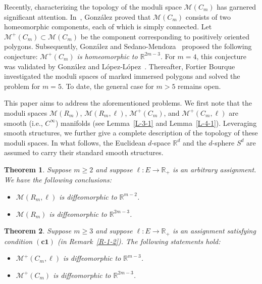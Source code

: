 \documentclass[11pt,letterpaper]{amsart}
\theoremstyle{plain}
\newtheorem{theorem}{Theorem}[section]
\theoremstyle{definition}
\theoremstyle{remark}
\numberwithin{equation}{section}
\begin{document}
Recently, characterizing the topology of the moduli space $\mathcal M(C_m)$ has garnered significant attention. In~\cite{Gonzalez-2018}, Gonz\'{a}lez proved that $\mathcal M(C_m)$ consists of two homeomorphic components, each of which is simply connected. Let $\mathcal M^{+}(C_m)\subset \mathcal M (C_m)$ be the component corresponding to positively oriented polygons. Subsequently, Gonz\'{a}lez and Sedano-Mendoza~\cite[Conjecture 1.1]{Gonzalez-2023} proposed the following conjecture: \emph{$\mathcal M^{+}(C_m)$ is homeomorphic to $\mathbb R^{2m-3}$}. For $m=4$, this
conjecture was validated by Gonz\'{a}lez and  L\'{o}pez-L\'{o}pez~\cite{Gonzalez-2016}. Thereafter, Fortier Bourque~\cite{Fortier Bourque-2024} investigated the moduli spaces of marked immersed polygons and solved the problem for $m=5$. To date, the general case for $m>5$ remains open.

This paper aims to address the aforementioned problems. We first note that the moduli spaces $\mathcal M(R_m)$, $\mathcal M(R_m,\ell)$, $\mathcal M^{+}(C_m)$, and $\mathcal M^{+}(C_m,\ell)$ are smooth (i.e., $C^\infty$) manifolds (see Lemma~\ref{L-3-1} and Lemma~\ref{L-4-1}). Leveraging smooth structures, we further give a complete description of the topology of these moduli spaces. In what follows, the Euclidean $d$-space $\mathbb R^d$ and the $d$-sphere $S^d$ are assumed to carry their standard smooth structures.


\begin{theorem}\label{T-1-3}
Suppose $m\geq 2$ and suppose $\ell:E\to\mathbb R_{+}$ is an arbitrary assignment. We have the following conclusions:
\begin{itemize}
\item[$(i)$] $\mathcal M(R_m,\ell)$ is diffeomorphic to $\mathbb{R}^{m-2}$.
\item[$(ii)$]$\mathcal M(R_m)$ is diffeomorphic to $\mathbb{R}^{2m-3}$.
\end{itemize}
\end{theorem}


\begin{theorem}\label{T-1-4}%
Suppose $m\geq 3$ and suppose $\ell:E\to\mathbb R_{+}$ is an assignment satisfying condition $\mathrm{\mathbf{(c1)}}$
(in Remark~\ref{R-1-2}). The following statements hold:
\begin{itemize}
\item[$(i)$]  $\mathcal M^{+}(C_m,\ell)$ is diffeomorphic to $\mathbb{R}^{m-3}$.
\item[$(ii)$] $\mathcal M^{+}(C_m)$ is diffeomorphic to $\mathbb{R}^{2m-3}$.
\end{itemize}
\end{theorem}
\end{document}
